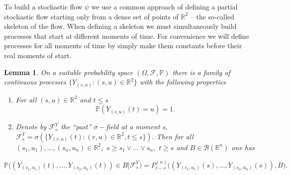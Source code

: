 \documentclass[a4paper,12pt]{article}
\newcommand{\1}{1\!\!\,{\rm I}}
\theoremstyle{plain}
\newtheorem{lemma}{Lemma}[section]
\begin{document}
To build a stochastic flow $\psi$ we use a common  approach \cite{FINR, TW} of defining a partial stochastic flow starting only from a dense set of points of $\mathbb{R}^2$ -- the so-called skeleton of the flow. When defining a skeleton we must simultaneously build processes that start at different moments of time. For convenience we will define processes for all moments of time by simply make them constants before their real moments of start. 

\begin{lemma}
	\label{lem2} On a suitable probability space $(\Omega,\mathcal{F},\mathbb{P})$ there is a family of continuous processes $\{Y_{(s,u)}:(s,u)\in\mathbb{R}^2\}$ with the following properties
	
	\begin{enumerate}
		\item For all $(s,u)\in \mathbb{R}^2$ and $t\leq s$
		$$
		\mathbb{P}(Y_{(s,u)}(t)=u)=1.
		$$
		
		\item Denote by $\mathcal{F}^Y_s$ the ``past'' $\sigma-$field at a moment $s,$ $		\mathcal{F}^Y_s=\sigma(\{Y_{(r,u)}(t):(r,u)\in\mathbb{R}^2, t\leq s\}).$ 		Then for all $(s_1,u_1),\ldots,(s_n,u_n)\in\mathbb{R}^2,$ $s\geq s_1\vee \ldots \vee s_n,$ $t\geq s$ and $B\in\mathcal{B}(\mathbb{R}^n)$ one has 
		
	\end{enumerate}
	$$
	\mathbb{P}  \Big((Y_{(s_1,u_1)}(t),\ldots,Y_{(s_n,u_n)}(t))\in B|\mathcal{F}^Y_s\Big) 
	=P^{(n)}_{t-s}\Big((Y_{(s_1,u_1)}(s),\ldots,Y_{(s_n,u_n)}(s)),B\Big).
	$$
	
	
	
	
	
	
\end{lemma}
\end{document}
